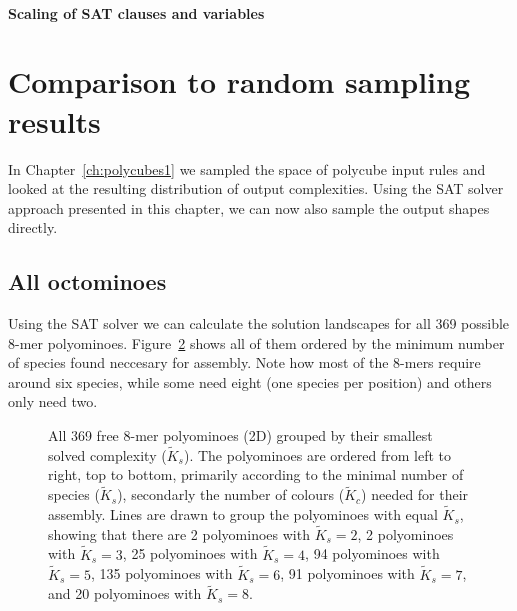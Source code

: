 \paragraph{Scaling of SAT clauses and variables}

\begin{figure}[ht]
    \centering
    
    \caption{}
    \label{fig:SAT_scaling}
\end{figure}



\section{Comparison to random sampling results}
In Chapter~\ref{ch:polycubes1} we sampled the space of polycube input rules and looked at the resulting distribution of output complexities. Using the SAT solver approach presented in this chapter, we can now also sample the output shapes directly. 

\subsection{All octominoes}
Using the SAT solver we can calculate the solution landscapes for all 369 possible 8-mer polyominoes. Figure~\ref*{fig:8-mers_grid} shows all of them ordered by the minimum number of species found neccesary for assembly. Note how most of the 8-mers require around six species, while some need eight (one species per position) and others only need two.

\begin{figure}[ht]
    \centering
    
    \caption{All 369 free 8-mer polyominoes (2D) grouped by their smallest solved complexity (\(\widetilde{K}_s\)). The polyominoes are ordered from left to right, top to bottom, primarily according to the minimal number of species (\(\widetilde{K}_s\)), secondarly the number of colours (\(\widetilde{K}_c\)) needed for their assembly. Lines are drawn to group the polyominoes with equal \(\widetilde{K}_s\), showing that there are 
    2 polyominoes with \(\widetilde{K}_s=2\),
    2 polyominoes with \(\widetilde{K}_s=3\),
    25 polyominoes with \(\widetilde{K}_s=4\),
    94 polyominoes with \(\widetilde{K}_s=5\),
    135 polyominoes with \(\widetilde{K}_s=6\),
    91 polyominoes with \(\widetilde{K}_s=7\), and
    20 polyominoes with \(\widetilde{K}_s=8\).
    }
    \label{fig:8-mers_grid}
\end{figure}

